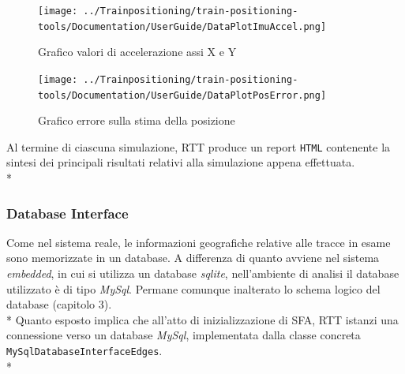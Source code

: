 \begin{figure}[h]
	\centering
	\texttt{[image: ../Trainpositioning/train-positioning-tools/Documentation/UserGuide/DataPlotImuAccel.png]}
	\caption{Grafico valori di accelerazione assi X e Y}
	\label{fig:imuxy}
\end{figure}
\begin{figure}[h]
	\centering
	\texttt{[image: ../Trainpositioning/train-positioning-tools/Documentation/UserGuide/DataPlotPosError.png]}
	\caption{Grafico errore sulla stima della posizione}
	\label{fig:dataplotposerror}
\end{figure}
Al termine di ciascuna simulazione, RTT produce un report \texttt{HTML} contenente la sintesi dei principali risultati relativi alla simulazione appena effettuata.\\*
\subsubsection{Database Interface}
Come nel sistema reale, le informazioni geografiche relative alle tracce in esame sono memorizzate in un database. A differenza di quanto avviene nel sistema \emph{embedded}, in cui si utilizza un database \emph{sqlite}, nell'ambiente di analisi il database utilizzato \`e di tipo \emph{MySql}. Permane comunque inalterato lo schema logico del database (capitolo 3).\\*
Quanto esposto implica che all'atto di inizializzazione di SFA, RTT istanzi una connessione verso un database \emph{MySql}, implementata dalla classe concreta \texttt{MySqlDatabaseInterfaceEdges}.\\*